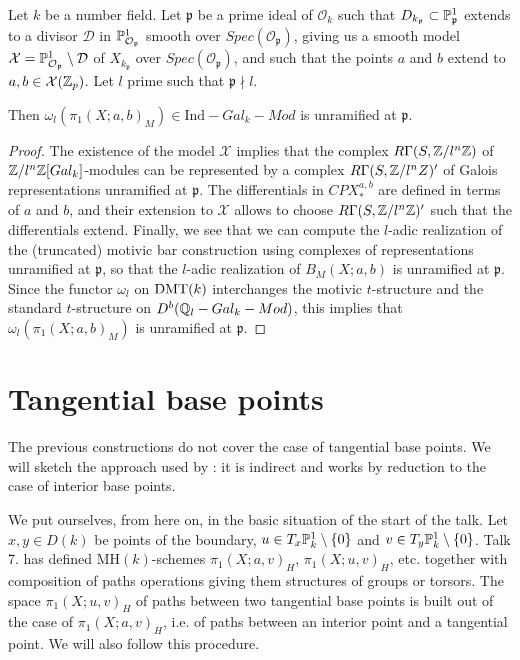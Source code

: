 \begin{prop}
\label{pi_1_a_unr}
Let $k$ be a number field. Let $\mathfrak{p}$ be a prime ideal of $\mathcal{O}_k$ such that $D_{k_{\mathfrak{p}}}\subset \mathbb{P}^1_{\mathfrak{p}}$ extends to a divisor $\mathcal{D}$ in $\mathbb{P}^1_{\mathcal{O}_\mathfrak{p}}$ smooth over $Spec(\mathcal{O}_{\mathfrak{p}})$, giving us a smooth model $\mathcal{X}=\mathbb{P}^1_{\mathcal{O}_\mathfrak{p}}\setminus \mathcal{D}$ of $X_{k_\mathfrak{p}}$ over $Spec(\mathcal{O}_{\mathfrak{p}})$, and such that the points $a$ and $b$ extend to $a,b\in \mathcal{X}(\mathbb{Z}_p)$. Let $l$ prime such that $\mathfrak{p}\nmid l$. 

Then $\omega_l(\pi_1(X;a,b)_M)\in \mathrm{Ind}-Gal_k-Mod$ is unramified at $\mathfrak{p}$.
\end{prop}
\begin{proof}
The existence of the model $\mathcal{X}$ implies that the complex $R\Gamma(S,\mathbb{Z}/l^n\mathbb{Z})$ of $\mathbb{Z}/l^n\mathbb{Z}[Gal_k]$-modules can be represented by a complex $R\Gamma(S,\mathbb{Z}/l^nZ)'$ of Galois representations unramified at $\mathfrak{p}$. The differentials in $CPX^{a,b}_*$ are defined in terms of $a$ and $b$, and their extension to $\mathcal{X}$ allows to choose $R\Gamma(S,\mathbb{Z}/l^n\mathbb{Z})'$ such that the differentials extend. Finally, we see that we can compute the $l$-adic realization of the (truncated) motivic bar construction using complexes of representations unramified at $\mathfrak{p}$, so that the $l$-adic realization of $B_M(X;a,b)$ is unramified at $\mathfrak{p}$. Since the functor $\omega_l$ on $\mathrm{DMT}(k)$ interchanges the motivic $t$-structure and the standard $t$-structure on $D^b(\mathbb{Q}_l-Gal_k-Mod)$, this implies that $\omega_l(\pi_1(X;a,b)_M)$ is unramified at $\mathfrak{p}$. 
\end{proof}

\section{Tangential base points}

The previous constructions do not cover the case of tangential base points. We will sketch the approach used by \cite{deligne-goncharov05} : it is indirect and works by reduction to the case of interior base points.

We put ourselves, from here on, in the basic situation of the start of the talk. Let $x,y\in D(k)$ be points of the boundary, $u\in T_x\mathbb{P}^1_k\setminus \{0\}$ and $v\in T_y\mathbb{P}^1_k\setminus\{0\}$. Talk 7. has defined $\mathrm{MH}(k)$-schemes $\pi_1(X;a,v)_H$, $\pi_1(X;u,v)_H$, etc. together with composition of paths operations giving them structures of groups or torsors. The space $\pi_1(X;u,v)_H$ of paths between two tangential base points is built out of the case of $\pi_1(X;a,v)_H$, i.e. of paths between an interior point and a tangential point. We will also follow this procedure.

